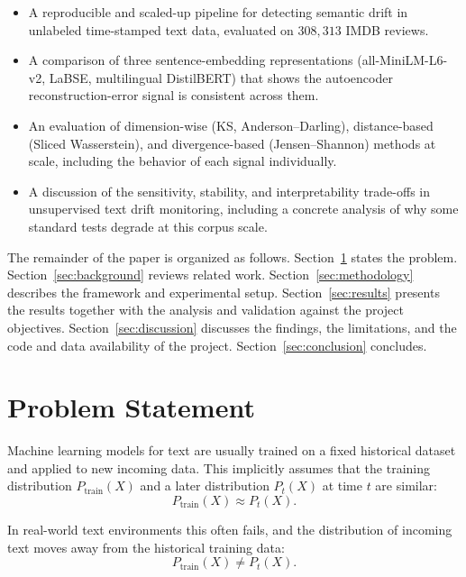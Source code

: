 \documentclass[conference]{IEEEtran}
\begin{document}
\begin{itemize}
    \item A reproducible and scaled-up pipeline for detecting semantic drift in unlabeled time-stamped text data, evaluated on $308{,}313$ IMDB reviews.
    \item A comparison of three sentence-embedding representations (all-MiniLM-L6-v2, LaBSE, multilingual DistilBERT) that shows the autoencoder reconstruction-error signal is consistent across them.
    \item An evaluation of dimension-wise (KS, Anderson--Darling), distance-based (Sliced Wasserstein), and divergence-based (Jensen--Shannon) methods at scale, including the behavior of each signal individually.
    \item A discussion of the sensitivity, stability, and interpretability trade-offs in unsupervised text drift monitoring, including a concrete analysis of why some standard tests degrade at this corpus scale.
\end{itemize}

The remainder of the paper is organized as follows. Section~\ref{sec:problem} states the problem. Section~\ref{sec:background} reviews related work. Section~\ref{sec:methodology} describes the framework and experimental setup. Section~\ref{sec:results} presents the results together with the analysis and validation against the project objectives. Section~\ref{sec:discussion} discusses the findings, the limitations, and the code and data availability of the project. Section~\ref{sec:conclusion} concludes.

\section{Problem Statement}
\label{sec:problem}

Machine learning models for text are usually trained on a fixed historical dataset and applied to new incoming data. This implicitly assumes that the training distribution $P_{\text{train}}(X)$ and a later distribution $P_t(X)$ at time $t$ are similar:
\begin{equation}
P_{\text{train}}(X) \approx P_t(X).\label{eq:assumption}
\end{equation}

In real-world text environments this often fails, and the distribution of incoming text moves away from the historical training data:
\begin{equation}
P_{\text{train}}(X) \neq P_t(X).\label{eq:drift}
\end{equation}
\end{document}
